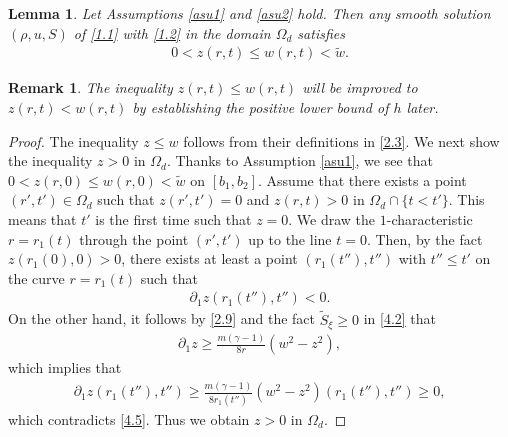 \documentclass[11pt,reqno]{article}
\newtheorem{lem}{Lemma}[section]
\newtheorem{rem}{Remark}
\newcommand{\pa}{\partial}
\numberwithin{equation}{section}
\begin{document}
\begin{lem}\label{lem3}
Let Assumptions \ref{asu1} and \ref{asu2} hold. Then any smooth solution $(\rho, u, S)$ of \eqref{1.1} with \eqref{1.2} in the domain $\Omega_d$ satisfies
\begin{align}\label{4.4}
0<z(r,t)\leq w(r,t)<\tilde{w}.
\end{align}
\end{lem}
\begin{rem}\label{r-a}
The inequality $z(r,t)\leq w(r,t)$ will be improved to $z(r,t)< w(r,t)$ by establishing the positive lower bound of $h$ later.
\end{rem}
\begin{proof}
The inequality $z\leq w$ follows from their definitions in \eqref{2.3}. We next show the inequality $z>0$ in $\Omega_d$.
Thanks to Assumption \ref{asu1}, we see that $0<z(r,0)\leq w(r,0)< \tilde{w}$ on $[b_1,b_2]$.
Assume that there exists a point $(r',t')\in\Omega_d$ such that $z(r',t')=0$ and $z(r,t)>0$ in $\Omega_d\cap\{t<t'\}$. This means that $t'$ is the first time such that $z=0$. We draw the $1$-characteristic $r=r_1(t)$ through the point $(r',t')$ up to the line $t=0$. Then, by the fact $z(r_1(0),0)>0$, there exists at least a point $(r_1(t''),t'')$ with $t''\leq t'$ on the curve $r=r_1(t)$ such that
\begin{align}\label{4.5}
\pa_1z(r_1(t''),t'')<0.
\end{align}
On the other hand, it follows by \eqref{2.9} and the fact $\widetilde{S}_\xi\geq0$ in \eqref{4.2} that
\begin{align*}
\pa_1z\geq\frac{m(\gamma-1)}{8r} (w^2-z^2),
\end{align*}
which implies that
\begin{align}\label{4.6}
\pa_1z(r_1(t''),t'')\geq\frac{m(\gamma-1)}{8r_1(t'')} (w^2-z^2)(r_1(t''),t'')\geq0,
\end{align}
which contradicts \eqref{4.5}. Thus we obtain $z>0$ in $\Omega_d$.


\end{proof}
\end{document}
